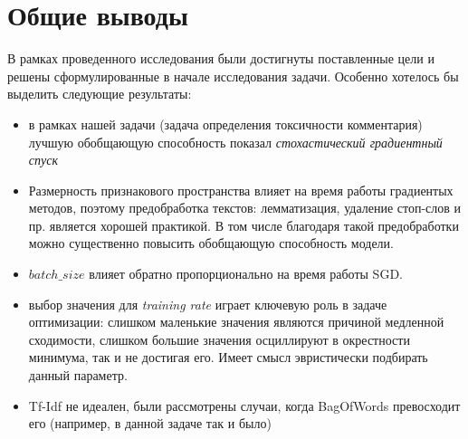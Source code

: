 \section{\huge Общие выводы}

В рамках проведенного исследования были достигнуты поставленные цели и решены сформулированные в начале исследования задачи. Особенно хотелось бы выделить следующие результаты:
\begin{itemize}
	\item в рамках нашей задачи (задача определения токсичности комментария) лучшую обобщающую способность показал {\itshape стохастический градиентный спуск} 
	\item Размерность признакового пространства влияет на время работы градиентых методов, поэтому предобработка текстов: лемматизация, удаление стоп-слов и пр. является хорошей практикой. В том числе благодаря такой предобработки можно существенно повысить обобщающую способность модели.
	\item $batch\_size$ влияет обратно пропорционально на время работы SGD.
	\item выбор значения для {\itshape training rate} играет ключевую роль в задаче оптимизации: слишком маленькие значения являются причиной медленной сходимости, слишком большие значения осциллируют в окрестности минимума, так и не достигая его. Имеет смысл эвристически подбирать данный параметр.
	\item Tf-Idf не идеален, были рассмотрены случаи, когда BagOfWords превосходит его (например, в данной задаче так и было)
\end{itemize}